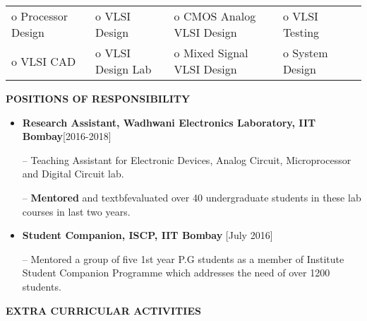 \documentclass{article}
\newcommand{\hilight}[1]{\colorbox{light-gray}{#1}}
\begin{document}
\begin{table}[htbp]
\centering
\begin{tabular}{lllll}
o Processor Design & o VLSI Design     & o CMOS Analog VLSI Design  & o VLSI Testing  &  \\
o VLSI CAD         & o VLSI Design Lab & o Mixed Signal VLSI Design & o System Design & 
\end{tabular}
\end{table}
\vspace{-3mm}
 \begin{theorem}
   \vspace{-0.7mm}
\begin{center}
\textbf{POSITIONS OF RESPONSIBILITY
}\end{center}  
\vspace{-0.7mm}    
   \end{theorem}
\vspace{-3mm}
\begin{itemize}
\setlength{\itemsep}{-0.30em}

\item \textbf{Research Assistant, Wadhwani Electronics Laboratory, IIT Bombay}\hfill[2016-2018] 
\item[--] Teaching Assistant for Electronic Devices, Analog Circuit, Microprocessor and Digital Circuit lab.
\item[--] \textbf{Mentored} and textbf{evaluated} over 40 undergraduate students in these lab courses in last two years.



\item \textbf{Student Companion, ISCP, IIT Bombay }\hfill[July 2016]
\item[--] Mentored a group of five 1st year P.G students as a member of Institute Student Companion Programme
which addresses the need of over 1200 students.\\

\end{itemize}
\vspace{-3mm}%
 \begin{theorem}
   \vspace{-0.7mm}
\begin{center}
\textbf{ EXTRA CURRICULAR ACTIVITIES
}\end{center}  
\vspace{-0.7mm}    
   \end{theorem}
\end{document}

